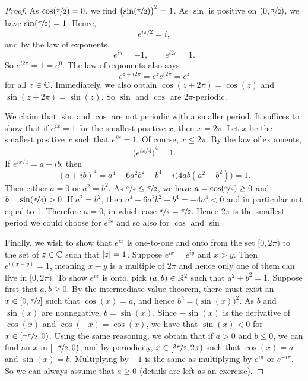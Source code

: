 \begin{proof}
As $\cos(\nicefrac{\pi}{2}) = 0$, we find
${\bigl(\sin(\nicefrac{\pi}{2})\bigr)}^2 = 1$.
As $\sin$ is positive on $(0,\nicefrac{\pi}{2})$, we have
$\sin(\nicefrac{\pi}{2}) = 1$.
Hence,
\begin{equation*}
e^{i \pi /2} = i ,
\end{equation*}
and by the law of exponents,
\begin{equation*}
e^{i \pi} = -1 ,
\qquad 
e^{i 2\pi} = 1 .
\end{equation*}
So $e^{i2\pi} = 1 = e^0$.  The law of exponents also says
\begin{equation*}
e^{z+i2\pi} = e^z e^{i2\pi} = e^z
\end{equation*}
for all $z \in {\mathbb{C}}$.  Immediately, we also obtain
$\cos(z+2\pi) = \cos(z)$ and $\sin(z+2\pi) = \sin(z)$.
So $\sin$ and $\cos$ are $2\pi$-periodic.

We claim that $\sin$ and $\cos$ are not periodic with a smaller period.  It
suffices to show that if $e^{ix} = 1$ for the
smallest positive $x$, then
$x = 2\pi$.  Let $x$ be the smallest positive $x$ such that
$e^{ix} = 1$.
Of course, $x \leq 2\pi$.
By the law of exponents,
\begin{equation*}
{\bigl(e^{ix/4}\bigr)}^4 = 1 .
\end{equation*}
If $e^{ix/4} = a+ib$, then
\begin{equation*}
{(a+ib)}^4
=a^4-6a^2b^2+b^4 + i\bigl(4ab(a^2-b^2)\bigr)
=1 .
\end{equation*}
Then either $a = 0$ or $a^2 = b^2$.
As $\nicefrac{x}{4} \leq \nicefrac{\pi}{2}$, we have $a = \cos(\nicefrac{x}{4}) \geq 0$ and
$b = \sin(\nicefrac{x}{4}) > 0$.
If $a^2=b^2$, then
$a^4-6a^2b^2+b^4 = -4a^4 < 0$ and in particular not equal to 1.
Therefore $a=0$, in which case $\nicefrac{x}{4} = \nicefrac{\pi}{2}$.
Hence $2\pi$ is the smallest period we could choose for $e^{ix}$
and so also for $\cos$ and $\sin$.

Finally, we wish to show that $e^{ix}$ is one-to-one and onto
from the set $[0,2\pi)$ to the set of $z \in {\mathbb{C}}$ such that
$\lvert {z} \rvert = 1$.  Suppose $e^{ix} = e^{iy}$ and 
$x > y$.  Then
$e^{i(x-y)} = 1$, meaning $x-y$ is a multiple of $2\pi$ and hence
only one of them can live in $[0,2\pi)$.
To show $e^{ix}$ is onto, pick $(a,b) \in {\mathbb{R}}^2$ such that $a^2+b^2 = 1$.
Suppose first that $a,b \geq 0$.  By the intermediate value theorem,
there must exist an $x \in [0,\nicefrac{\pi}{2}]$ such that
$\cos(x) = a$, and hence $b^2 = \bigl(\sin(x)\bigr)^2$.  As
$b$ and $\sin(x)$ are nonnegative, $b = \sin(x)$.
Since $-\sin(x)$ is the derivative of $\cos(x)$
and $\cos(-x) = \cos(x)$,
we have that $\sin(x) < 0$ for $x \in [\nicefrac{-\pi}{2},0)$.
Using the same reasoning, we obtain that
if $a > 0$ and $b \leq 0$, we can find an $x$ in $[\nicefrac{-\pi}{2},0)$,
and by periodicity,
$x \in [\nicefrac{3\pi}{2},2\pi)$ such that $\cos(x) = a$ and $\sin(x)=b$.
Multiplying by $-1$ is the same as multiplying by $e^{i\pi}$ or
$e^{-i\pi}$.  So we can always assume that $a \geq 0$ (details are left
as an exercise).
\end{proof}

